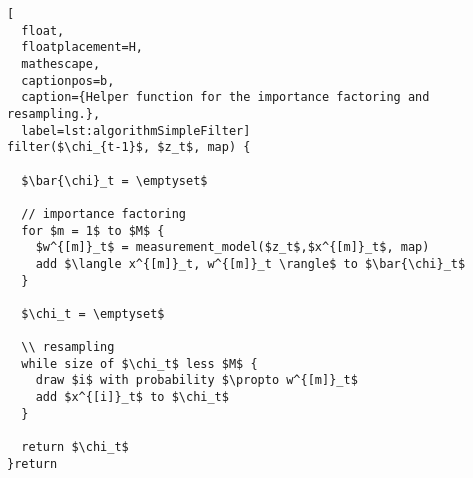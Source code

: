 \begin{lstlisting}[
  float,
  floatplacement=H,
  mathescape,
  captionpos=b,
  caption={Helper function for the importance factoring and resampling.},
  label=lst:algorithmSimpleFilter]
filter($\chi_{t-1}$, $z_t$, map) {

  $\bar{\chi}_t = \emptyset$

  // importance factoring
  for $m = 1$ to $M$ {
    $w^{[m]}_t$ = measurement_model($z_t$,$x^{[m]}_t$, map)
    add $\langle x^{[m]}_t, w^{[m]}_t \rangle$ to $\bar{\chi}_t$
  }

  $\chi_t = \emptyset$

  \\ resampling
  while size of $\chi_t$ less $M$ {
    draw $i$ with probability $\propto w^{[m]}_t$
    add $x^{[i]}_t$ to $\chi_t$
  }

  return $\chi_t$
}return\end{lstlisting}
